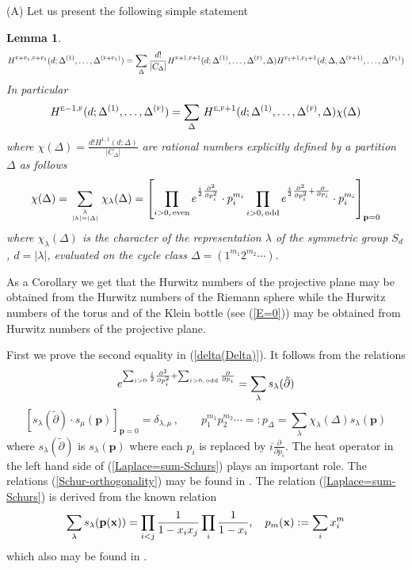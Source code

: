 \documentclass[a4paper,10pt]{article}
\newcommand{\bpow}{\mathbf{p}}
\theoremstyle{plain}
\newtheorem{Lemma}{Lemma}
\theoremstyle{remark}
\def\bl{\begin{Lemma}}
\def\el{\end{Lemma}}
\def\be{\begin{equation}}
\def\ee{\end{equation}}
\begin{document}
(A) Let us present the following simple statement
\bl
\label{Hurwitz-down-Lemma}
\be\label{Hurwitz=Hurwirz-Hurwitz}
H^{\textsc{e}+\textsc{e}_1,\textsc{f}+\textsc{f}_1}(d;\Delta^{(1)},\dots,\Delta^{(\textsc{f}+\textsc{f}_1)})=
\sum_{\Delta}\frac{d!}{|C_\Delta|}
H^{\textsc{e}+1,\textsc{f}+1}(d;\Delta^{(1)},\dots,\Delta^{(\textsc{f})},\Delta)
H^{\textsc{e}_1+1,\textsc{f}_1+1}(d;\Delta,\Delta^{(\textsc{f}+1)},\dots,\Delta^{(\textsc{f}_1)})
\ee
In particular
\be\label{Hurwitz-down}
H^{\textsc{e}-1,\textsc{f}}(d;\Delta^{(1)},\dots,\Delta^{(\textsc{f})})=
\sum_{\Delta}\,
H^{\textsc{e},\textsc{f}+1}(d;\Delta^{(1)},\dots,\Delta^{(\textsc{f})},\Delta) \chi(\Delta)
\ee
where $\chi(\Delta)=\frac{d!H^{1,1}(d;\Delta)}{|C_\Delta|}$ are rational numbers explicitly defined by a partition $\Delta$ as follows
\be\label{delta(Delta)}
\chi(\Delta)=\sum_{\lambda \atop |\lambda|=|\Delta|} \chi_\lambda(\Delta)=\left[
\prod_{i>0,\,{\rm even}}e^{\frac {i}{2}\frac{\partial^2}{\partial p_i^2}}\cdot p_i^{m_i}
\prod_{i>0,\,{\rm odd}}e^{\frac {i}{2}\frac{\partial^2}{\partial p_i^2}+
\frac{\partial}{\partial p_i}}\cdot p_i^{m_i}
\right]_{\bpow =0}
\ee
where $\chi_\lambda(\Delta)$ is the character of the representation $\lambda$ of the symmetric group
$S_d$, $d=|\lambda|$, evaluated on the cycle class $\Delta=(1^{m_1}2^{m_2}\cdots)$.

\el
As a Corollary we get that the Hurwitz numbers of the projective plane may be obtained from
the Hurwitz numbers of the Riemann sphere while the Hurwitz numbers of the torus and of the Klein bottle (see (\ref{E=0}))
may be obtained from Hurwitz numbers of the projective plane.

First we prove the second equality in (\ref{delta(Delta)}). It
follows from the relations
\be\label{Laplace=sum-Schurs}
e^{\sum_{i>0}\frac {i}{2}\frac{\partial^2}{\partial p_i^2}+
\sum_{i>0,\,{\rm odd}}\frac{\partial}{\partial p_i}}=\sum_{\lambda} s_\lambda({\tilde\partial})
\ee
\be\label{Schur-orthogonality}
 \left[s_\lambda({\tilde\partial})\cdot s_\mu(\bpow)   \right]_{\bpow=0}=\delta_{\lambda,\mu}\,,
\qquad
p_1^{m_1}p_2^{m_2}\cdots =:p_\Delta =\sum_{\lambda} \chi_\lambda(\Delta) s_\lambda(\bpow)
\ee
where $s_\lambda({\tilde\partial})$ is $s_\lambda(\bpow)$ where each $p_i$ is replaced by
$i\frac{\partial}{\partial p_i}$. The heat operator in the left hand side of (\ref{Laplace=sum-Schurs}) plays an important role.
The relations (\ref{Schur-orthogonality})
may be found in \cite{Mac}. The relation (\ref{Laplace=sum-Schurs}) is derived from the known relation
\be\label{sum-Schurs}
 \sum_\lambda s_\lambda(\bpow({\bf x}))=\prod_{i<j}\frac{1}{1-x_ix_j}\prod_{i}\frac{1}{1-x_i},
 \quad p_m({\bf x}):=\sum_i x_i^m
\ee
which also may be found in \cite{Mac}.
\end{document}

